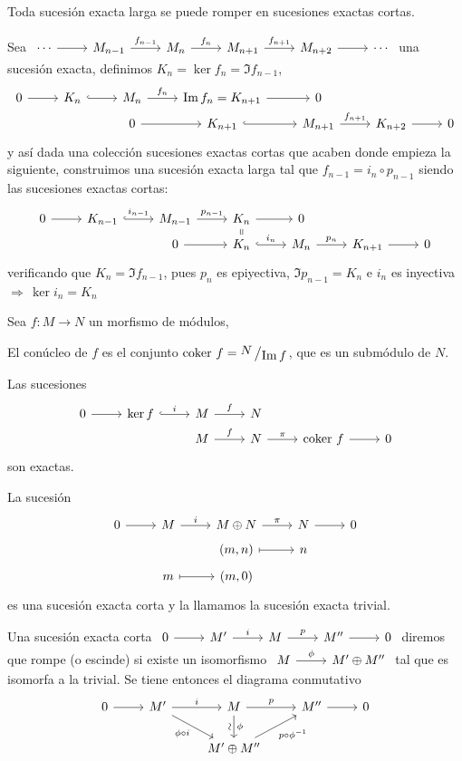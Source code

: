 \begin{prop}
    Toda sucesi\'on exacta larga se puede romper en sucesiones exactas cortas.
\end{prop}
\begin{dem}    
    Sea $\bt \cdots \arrow{r} & M_{n-1} \arrow{r}{f_{n-1}} & M_{n} \arrow{r}{f_{n}} & M_{n+1} \arrow{r}{f_{n+1}} & M_{n+2} \arrow{r} & \cdots \et$ una sucesi\'on exacta, definimos $K_n = \ker  f_n = \Im f_{n-1}$, 
    $$ \bt 
    0 \arrow{r} & K_n \arrow[hook]{r} & M_n \arrow{r}{f_n} & \Im f_n = K_{n+1} \arrow{r} & 0 \\[-5mm]
    & & 0 \arrow{r} & K_{n+1} \arrow[hook]{r} & M_{n+1} \arrow{r}{f_{n+1}} & K_{n+2} \arrow{r} & 0
    \et$$
    y as\'i dada una colecci\'on sucesiones exactas cortas que acaben donde empieza la siguiente, construimos una sucesi\'on exacta larga tal que $f_{n-1} = i_{n} \circ p_{n-1}$ siendo las sucesiones exactas cortas:
    $$ \bt 
    0 \arrow{r} & K_{n-1} \arrow[hook]{r}{i_{n-1}} & M_{n-1} \arrow{r}{p_{n-1}} &  K_{n} \arrow{r} & 0 \\[-5mm]
    & & 0 \arrow{r} & K_{n} \arrow[equal]{u} \arrow[hook]{r}{i_n} & M_{n} \arrow{r}{p_{n}} & K_{n+1} \arrow{r} & 0
    \et$$
    verificando que $K_n = \Im f_{n-1}$, pues $p_n$ es epiyectiva, $\Im p_{n-1} = K_n$ e $i_n$ es inyectiva $\Rightarrow \, \ker i_n = K_n$ 
    \end{dem}

Sea $f: M \longrightarrow N$ un morfismo de m\'odulos, 
\begin{defi} El conúcleo de $f$ es el conjunto
    $\coker \, f = \modulo{N}{\Im f}$, que es un subm\'odulo de $N$.
\end{defi}
\begin{prop} Las sucesiones
     $$ \bt 
    0 \arrow{r} & \ker  f \arrow[hook]{r}{i} & M \arrow{r}{f} &  N \\[-5mm]
    & &  M \arrow{r}{f} & N \arrow{r}{\pi} & \coker \, f \arrow{r} & 0
    \et$$
    son exactas.
\end{prop}
\begin{defi}
    La sucesi\'on 
    $$\bt 0 \arrow{r} & M \arrow{r}{i} & M \oplus N \arrow{r}{\pi} & N \arrow{r} & 0 \\[-5mm] 
    & & (m,n) \arrow[mapsto]{r} & n   \\[-5mm]
    & m \arrow[mapsto]{r} & (m,0)
    \et$$
    es una sucesi\'on exacta corta y la llamamos  la sucesi\'on exacta trivial.
\end{defi}
\begin{defi}
    Una sucesi\'on exacta corta $\bt 0 \arrow{r} & M' \arrow{r}{i} & M \arrow{r}{p} & M'' \arrow{r} & 0 \et$ diremos que rompe (o escinde) si existe un isomorfismo $\bt M \arrow{r}{\phi} & M' \oplus M'' \et$ tal que es isomorfa a la trivial. Se tiene entonces el diagrama conmutativo
    $$\bt 0 \arrow{r} & M' \arrow{r}{i} \arrow[dr, "\phi \circ i"'] & M \arrow[d, "\phi", "\rotatebox{270}{$\sim$}"'] \arrow{r}{p} & M'' \arrow{r} & 0 \\
    & & M' \oplus M'' \arrow[ur, "p  \circ \phi^{-1}"'] &
    \et$$
\end{defi}
